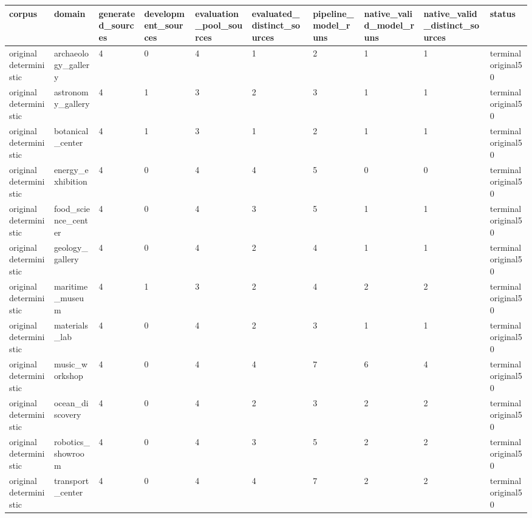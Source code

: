 \begin{tabular}{llllllllll}
\toprule
corpus & domain & generated\_sources & development\_sources & evaluation\_pool\_sources & evaluated\_distinct\_sources & pipeline\_model\_runs & native\_valid\_model\_runs & native\_valid\_distinct\_sources & status \\
\midrule
original deterministic & archaeology\_gallery & 4 & 0 & 4 & 1 & 2 & 1 & 1 & terminal original50 \\
original deterministic & astronomy\_gallery & 4 & 1 & 3 & 2 & 3 & 1 & 1 & terminal original50 \\
original deterministic & botanical\_center & 4 & 1 & 3 & 1 & 2 & 1 & 1 & terminal original50 \\
original deterministic & energy\_exhibition & 4 & 0 & 4 & 4 & 5 & 0 & 0 & terminal original50 \\
original deterministic & food\_science\_center & 4 & 0 & 4 & 3 & 5 & 1 & 1 & terminal original50 \\
original deterministic & geology\_gallery & 4 & 0 & 4 & 2 & 4 & 1 & 1 & terminal original50 \\
original deterministic & maritime\_museum & 4 & 1 & 3 & 2 & 4 & 2 & 2 & terminal original50 \\
original deterministic & materials\_lab & 4 & 0 & 4 & 2 & 3 & 1 & 1 & terminal original50 \\
original deterministic & music\_workshop & 4 & 0 & 4 & 4 & 7 & 6 & 4 & terminal original50 \\
original deterministic & ocean\_discovery & 4 & 0 & 4 & 2 & 3 & 2 & 2 & terminal original50 \\
original deterministic & robotics\_showroom & 4 & 0 & 4 & 3 & 5 & 2 & 2 & terminal original50 \\
original deterministic & transport\_center & 4 & 0 & 4 & 4 & 7 & 2 & 2 & terminal original50 \\
\bottomrule
\end{tabular}
